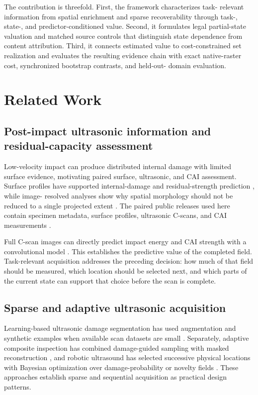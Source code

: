 \documentclass[preprint,12pt]{elsarticle}
\begin{document}
The contribution is threefold. First, the framework characterizes task-
relevant information from spatial enrichment and sparse recoverability through
task-, state-, and predictor-conditioned value. Second, it formulates legal
partial-state valuation and matched source controls that distinguish state
dependence from content attribution. Third, it connects estimated value to
cost-constrained set realization and evaluates the resulting evidence chain
with exact native-raster cost, synchronized bootstrap contrasts, and held-out-
domain evaluation.

\section{Related Work}
\label{sec:related-work}

\subsection{Post-impact ultrasonic information and residual-capacity assessment}
\label{sec:related-cai}

Low-velocity impact can produce distributed internal damage with limited
surface evidence, motivating paired surface, ultrasonic, and CAI assessment.
Surface profiles have supported internal-damage and residual-strength
prediction \cite{hasebe2022internal,hasebe2025compression}, while image-
resolved analyses show why spatial morphology should not be reduced to a
single projected extent \cite{bull2018image}. The paired public releases used
here contain specimen metadata, surface profiles, ultrasonic C-scans, and CAI
measurements \cite{hasebe2022dataset,hasebe2025caidataset}.

Full C-scan images can directly predict impact energy and CAI strength with a
convolutional model \cite{mack2026cscan}. This establishes the predictive value
of the completed field. Task-relevant acquisition addresses the preceding
decision: how much of that field should be measured, which location should be
selected next, and which parts of the current state can support that choice
before the scan is complete.

\subsection{Sparse and adaptive ultrasonic acquisition}
\label{sec:related-adaptive}

Learning-based ultrasonic damage segmentation has used augmentation and
synthetic examples when available scan datasets are small
\cite{nguyen2025sparse}. Separately, adaptive composite inspection has combined
damage-guided sampling with masked reconstruction
\cite{ji2026adaptive}, and robotic ultrasound has selected successive physical
locations with Bayesian optimization over damage-probability or novelty fields
\cite{fuentes2020autonomous}. These approaches establish sparse and sequential
acquisition as practical design patterns.
\end{document}

